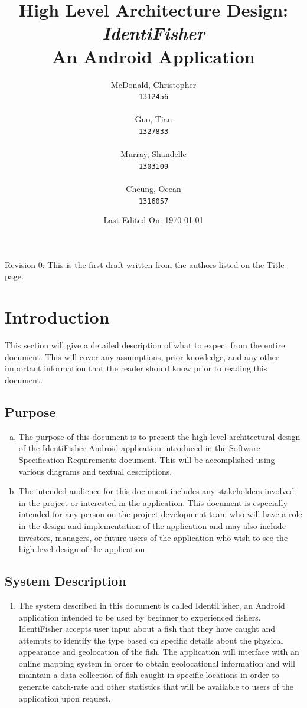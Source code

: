 \documentclass[]{article}
\title{High Level Architecture Design: \\ \textit{IdentiFisher} \\ An Android Application \\}
\author{
\Large McDonald, Christopher\\
\texttt{1312456} \\ \\
\Large Guo, Tian\\
\texttt{1327833} \\ \\
\Large Murray, Shandelle\\
\texttt{1303109} \\ \\
\Large Cheung, Ocean\\
\texttt{1316057} \\
}
\date{Last Edited On: \today}
\begin{document}
\maketitle

\newpage
\tableofcontents

\vfill
Revision 0: This is the first draft written from the authors listed on the Title page.
\pagebreak

\section{Introduction}
\label{sec:introduction}
This section will give a detailed description of what to expect from the entire document. This will cover any assumptions, prior knowledge, and any other important information that the reader should know prior to reading this document.

\subsection{Purpose}
\label{sub:purpose}
\begin{enumerate}[a)]
	\item
	The purpose of this document is to present the high-level architectural design of the IdentiFisher Android application introduced in the Software Specification Requirements document. This will be accomplished using various diagrams and textual descriptions.
	\item
	The intended audience for this document includes any stakeholders involved in the project or interested in the application. This document is especially intended for any person on the project development team who will have a role in the design and implementation of the application and may also include investors, managers, or future users of the application who wish to see the high-level design of the application.
\end{enumerate}

\subsection{System Description}
\label{sub:system_description}
\begin{enumerate}[]
	\item
	The system described in this document is called IdentiFisher, an Android application intended to be used by beginner to experienced fishers. IdentiFisher accepts user input about a fish that they have caught and attempts to identify the type based on specific details about the physical appearance and geolocation of the fish. The application will interface with an online mapping system in order to obtain geolocational information and will maintain a data collection of fish caught in specific locations in order to generate catch-rate and other statistics that will be available to users of the application upon request.
\end{enumerate}
\end{document}

